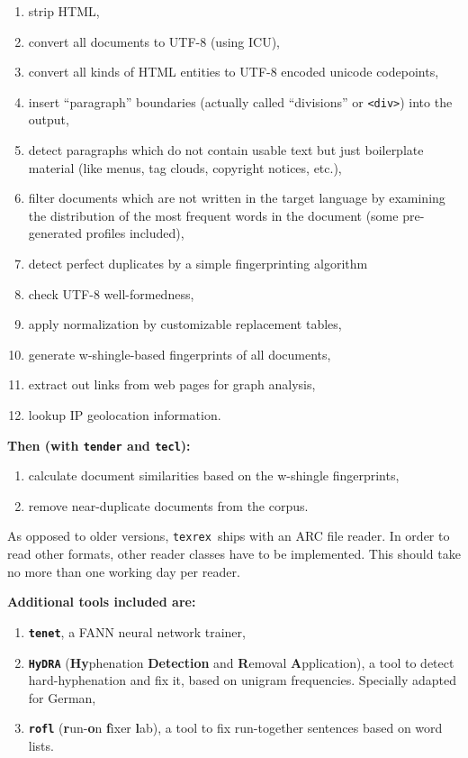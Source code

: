 \documentclass[12pt,a4paper]{article}
\newcommand{\trthis}{\texttt{texrex}}
\begin{document}
\begin{enumerate}
  \item strip HTML,
  \item convert all documents to UTF-8 (using ICU),
  \item convert all kinds of HTML entities to UTF-8 encoded unicode codepoints,
  \item insert ``paragraph'' boundaries (actually called ``divisions'' or \texttt{<div>}) into the output,
  \item detect paragraphs which do not contain usable text but just boilerplate material (like menus, tag clouds, copyright notices, etc.),
  \item filter documents which are not written in the target language by examining the distribution of the most frequent words in the document (some pre-generated profiles included),
  \item detect perfect duplicates by a simple fingerprinting algorithm
  \item check UTF-8 well-formedness,
  \item apply normalization by customizable replacement tables,
  \item generate w-shingle-based fingerprints of all documents,
  \item extract out links from web pages for graph analysis,
  \item lookup IP geolocation information.
\end{enumerate}

\vspace{0.5cm}

\textbf{Then (with \texttt{tender} and \texttt{tecl}):}

\begin{enumerate}
  \item calculate document similarities based on the w-shingle fingerprints,
  \item remove near-duplicate documents from the corpus.
\end{enumerate}

As opposed to older versions, \trthis\ ships with an ARC file reader.
In order to read other formats, other reader classes have to be implemented.
This should take no more than one working day per reader.

\textbf{Additional tools included are:}

\begin{enumerate}
  \item \textbf{\texttt{tenet}}, a FANN neural network trainer,
  \item \textbf{\texttt{HyDRA}} (\textbf{Hy}phenation \textbf{Detection} and \textbf{R}emoval \textbf{A}pplication), a tool to detect hard-hyphenation and fix it, based on unigram frequencies. Specially adapted for German,
  \item \textbf{\texttt{rofl}} (\textbf{r}un-\textbf{o}n \textbf{f}ixer \textbf{l}ab), a tool to fix run-together sentences based on word lists.
\end{enumerate}
\end{document}
